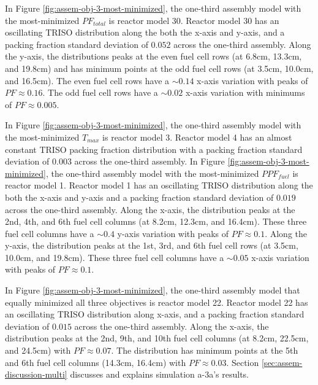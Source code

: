 In Figure \ref{fig:assem-obj-3-most-minimized}, the one-third assembly model with 
the most-minimized $PF_{total}$ is reactor model 30. 
Reactor model 30 has an oscillating TRISO distribution along the both the 
x-axis and y-axis, and a packing fraction standard deviation of $0.052$ across the 
one-third assembly. 
Along the y-axis, the distributions peaks at the even fuel cell rows (at 6.8cm, 
13.3cm, and 19.8cm) and has minimum points at the odd fuel cell rows (at 3.5cm, 
10.0cm, and 16.5cm). 
The even fuel cell rows have a $\sim0.14$ x-axis variation with peaks of 
$PF\approx0.16$. 
The odd fuel cell rows have a $\sim0.02$ x-axis variation with minimums of 
$PF\approx0.005$. 

In Figure \ref{fig:assem-obj-3-most-minimized}, the one-third assembly model with 
the most-minimized $T_{max}$ is reactor model 3. 
Reactor model 4 has an almost constant TRISO packing fraction distribution with 
a packing fraction standard deviation of $0.003$ across the one-third assembly. 
In Figure \ref{fig:assem-obj-3-most-minimized}, the one-third assembly model with 
the most-minimized $PPF_{fuel}$ is reactor model 1.
Reactor model 1 has an oscillating TRISO distribution along the both the 
x-axis and y-axis and a packing fraction standard deviation of $0.019$ across the 
one-third assembly.
Along the x-axis, the distribution peaks at the 2nd, 4th, and 6th fuel cell columns (at 
8.2cm, 12.3cm, and 16.4cm). 
These three fuel cell columns have a $\sim0.4$ y-axis variation with peaks of 
$PF\approx0.1$. 
Along the y-axis, the distribution peaks at the 1st, 3rd, and 6th fuel cell rows (at 
3.5cm, 10.0cm, and 19.8cm).
These three fuel cell columns have a $\sim0.05$ x-axis variation with peaks of 
$PF\approx0.1$. 

In Figure \ref{fig:assem-obj-3-most-minimized}, the one-third assembly model that 
equally minimized all three objectives is reactor model 22. 
Reactor model 22 has an oscillating TRISO distribution along x-axis, and a packing 
fraction standard deviation of $0.015$ across the one-third assembly. 
Along the x-axis, the distribution peaks at the 2nd, 9th, and 10th fuel cell columns 
(at 8.2cm, 22.5cm, and 24.5cm) with $PF\approx0.07$.
The distribution has minimum points at the 5th and 6th fuel cell columns (14.3cm, 
16.4cm) with $PF\approx0.03$.
Section \ref{sec:assem-discussion-multi} discusses and explains simulation a-3a's 
results.


